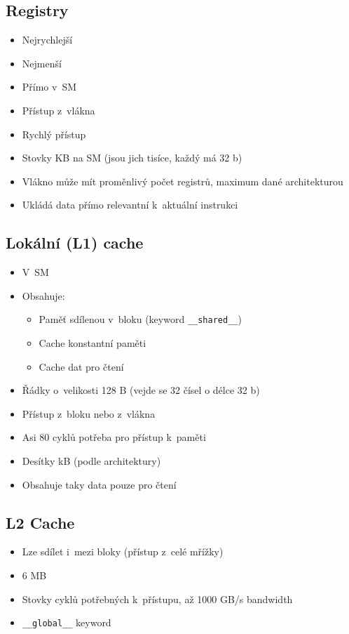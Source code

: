 \subsection{Registry}
\begin{itemize}
    \item Nejrychlejší
    \item Nejmenší
    \item Přímo v~SM
    \item Přístup z~vlákna
    \item Rychlý přístup
    \item Stovky KB na SM (jsou jich tisíce, každý má 32 b)
    \item Vlákno může mít proměnlivý počet registrů, maximum dané architekturou
    \item Ukládá data přímo relevantní k~aktuální instrukci
\end{itemize}

\subsection{Lokální (L1) cache}
\begin{itemize}
    \item V~SM
    \item Obsahuje:
    \begin{itemize}
        \item Paměť sdílenou v~bloku (keyword \texttt{\_\_shared\_\_})
        \item Cache konstantní paměti
        \item Cache dat pro čtení
    \end{itemize}
    \item Řádky o~velikosti 128 B (vejde se 32 čísel o délce 32 b)
    \item Přístup z~bloku nebo z~vlákna
    \item Asi 80 cyklů potřeba pro přístup k~paměti
    \item Desítky kB (podle architektury)
    \item Obsahuje taky data pouze pro čtení
\end{itemize}

\subsection{L2 Cache}
\begin{itemize}
    \item Lze sdílet i~mezi bloky (přístup z~celé mřížky)
    \item 6 MB
    \item Stovky cyklů potřebných k~přístupu, až 1000 GB/s bandwidth
    \item \texttt{\_\_global\_\_} keyword
\end{itemize}

